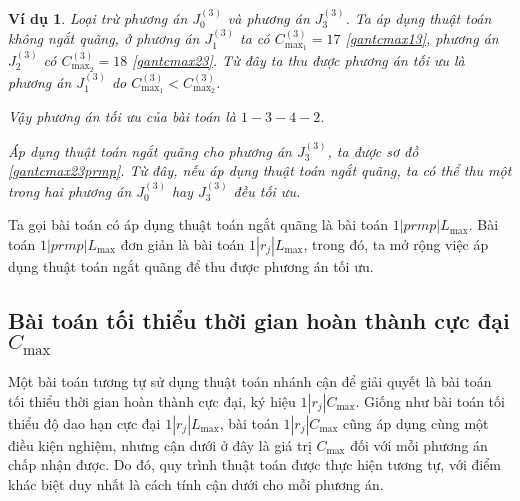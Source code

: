 \documentclass[12pt,a4paper]{report}
\newtheorem{vd}{Ví dụ}
\begin{document}
\begin{vd}
Loại trừ phương án $J_0^{(3)}$ và phương án $J_3^{(3)}$. Ta áp dụng thuật toán không ngắt quãng, ở phương án $J_1^{(3)}$ ta có $C_{\max _1}^{(3)} = 17$ \eqref{gantcmax13}, phương án $J_2^{(3)}$ có $C_{\max _2}^{(3)} = 18$ \eqref{gantcmax23}. Từ đây ta thu được phương án tối ưu là phương án $J_1^{(3)}$ do $C_{\max _1}^{(3)} < C_{\max _2}^{(3)}$.

Vậy phương án tối ưu của bài toán là $1-3-4-2$.

Áp dụng thuật toán ngắt quãng cho phương án $J_3^{(3)}$, ta được sơ đồ \eqref{gantcmax23prmp}. Từ đây, nếu áp dụng thuật toán ngắt quãng, ta có thể thu một trong hai phương án $J_0^{(3)}$ hay $J_3^{(3)}$ đều tối ưu.

\end{vd}

Ta gọi bài toán có áp dụng thuật toán ngắt quãng là bài toán $1|prmp|L_{\max}$. Bài toán $1|prmp|L_{\max}$ đơn giản là bài toán $1|r_j|L_{\max}$, trong đó, ta mở rộng việc áp dụng thuật toán ngắt quãng để thu được phương án tối ưu.


\subsection{Bài toán tối thiểu thời gian hoàn thành cực đại $C_{\max}$}




Một bài toán tương tự sử dụng thuật toán nhánh cận để giải quyết là bài toán tối thiểu thời gian hoàn thành cực đại, ký hiệu $1|r_j|C_{\max}$. Giống như bài toán tối thiểu độ dao hạn cực đại $1|r_j|L_{\max}$, bài toán $1|r_j|C_{\max}$ cũng áp dụng cùng một điều kiện nghiệm, nhưng cận dưới ở đây là giá trị $C_{\max}$ đối với mỗi phương án chấp nhận được. Do đó, quy trình thuật toán được thực hiện tương tự, với điểm khác biệt duy nhất là cách tính cận dưới cho mỗi phương án.
\end{document}
